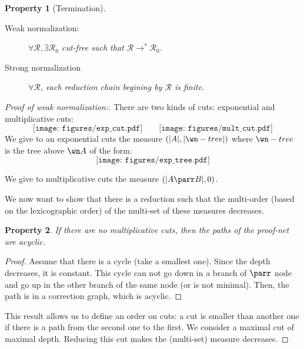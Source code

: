 \documentclass[a4paper,10pt]{article}
\newtheorem{prop}{Property}
\begin{document}
	\begin{prop}[Termination]
	\begin{description}
		\item[Weak normalization:] $\forall {\mathcal R}, \exists {\mathcal R_0}$ cut-free  such that ${\mathcal R} \rightarrow^* {\mathcal R_0}$.
		\item[Strong normalization] $\forall {\mathcal R}$, each reduction chain begining by ${\mathcal R}$ is finite.
	\end{description}		
	\end{prop}
	\begin{proof}[Proof of weak normalization:]
	 There are two kinds of cuts: exponential and multiplicative cuts: 
	 $$\texttt{[image: figures/exp\_cut.pdf]}\qquad \texttt{[image: figures/mult\_cut.pdf]}$$
	 We give to an exponential cuts the measure $(|A|, |\wn -tree|)$ where $\wn -tree$ is the tree above $\wn A$ of the form: $$\texttt{[image: figures/exp\_tree.pdf]}$$
	 
	 We give to multiplicative cuts the measure $(|A\parr B|, 0)$.
	 
	 We now want to show that there is a reduction such that the multi-order (based on the lexicographic order) of the multi-set of these measures decreases.
	 
	 \begin{prop}%
		If there are no multiplicative cuts, then the paths of the proof-net are acyclic.
	 \end{prop}
	 \begin{proof}
		Assume that there is a cycle (take a smallest one). Since the depth decreases, it is constant. This cycle can not go down in a branch of $\parr$ node and go up in the other branch of the same node (or is not minimal). Then, the path is in a correction graph, which is acyclic.
	 \end{proof}				
	 This result allows us to define an order on cuts: a cut is smaller than another one if there is a path from the second one to the first.
	 We consider a maximal cut of maximal depth. Reducing this cut makes the (multi-set) measure decreases.
	 \end{proof}
	 
	 
\end{document}
